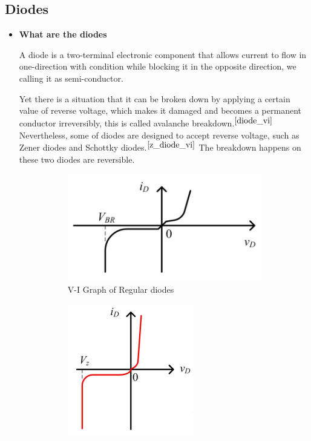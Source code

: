     \subsection{Diodes}
    \FloatBarrier
        \begin{itemize}
            \item \textbf{What are the diodes}\par
                A diode is a two-terminal electronic component that allows current to flow in one-direction with condition while blocking it in the opposite direction, we calling it as semi-conductor.\par
                Yet there is a situation that it can be broken down by applying a certain value of reverse voltage, which makes it damaged and becomes a permanent conductor irreversibly, this is called avalanche breakdown.$^{\ref{diode_vi}}$ Nevertheless, some of diodes are designed to accept reverse voltage, such as Zener diodes and Schottky diodes.$^{\ref{z_diode_vi}}$ The breakdown happens on these two diodes are reversible. \par
                \begin{figure}[h]
                    \centering
                    \begin{subfigure}[h]{0.45\textwidth}
                        \centering
                        \includegraphics[width=0.9\linewidth]{Lab1/Lab1_diode_vi.png}
                        \caption{V-I Graph of Regular diodes}
                        \label{diode_vi}
                    \end{subfigure}
                    \hfill
                    \begin{subfigure}[h]{0.45\textwidth}
                        \centering
                        \includegraphics[width=0.6\linewidth]{Lab1/Lab1_zener_diode_vi.png}

\end{subfigure}
\end{figure}
\end{itemize}
